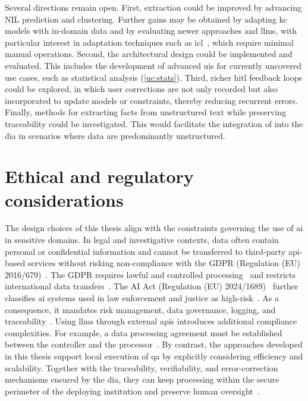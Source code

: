 \medskip
\noindent
Several directions remain open. First, extraction could be improved by advancing NIL prediction and clustering. Further gains may be obtained by adapting \acl{kc} models with in-domain data and by evaluating newer approaches and \acp{llm}, with particular interest in adaptation techniques such as \acl{icl}~\cite{jm3}, which require minimal manual operations.
Second, the architectural design could be implemented and evaluated. This includes the development of advanced \acp{ui} for currently uncovered use cases, such as statistical analysis (\ref{uc:stats}).
Third, richer \acl{hitl} feedback loops could be explored, in which user corrections are not only recorded but also incorporated to update models or constraints, thereby reducing recurrent errors.
Finally, methods for extracting facts from unstructured text while preserving traceability could be investigated. This would facilitate the integration of  into the \acl{dia} in scenarios where data are predominantly unstructured.

\section{Ethical and regulatory considerations}
The design choices of this thesis align with the constraints governing the use of \acf{ai} in sensitive domains. In legal and investigative contexts, data often contain personal or confidential information and cannot be transferred to third-party \ac{api}-based services without risking non-compliance with the GDPR (Regulation (EU) 2016/679)~\cite{gdpr2016}. The GDPR requires lawful and controlled processing~\cite[Art.~5]{gdpr2016} and restricts international data transfers~\cite[Art.~44--49]{gdpr2016}.
The AI Act (Regulation (EU) 2024/1689)~\cite{ai_act} further classifies \ac{ai} systems used in law enforcement and justice as high-risk~\cite[Annex~III]{ai_act}. As a consequence, it mandates risk management, data governance, logging, and traceability~\cite[Art.~9--12]{ai_act}.
Using \acp{llm} through external \acp{api} introduces additional compliance complexities. For example, a data processing agreement must be established between the controller and the processor~\cite[Art.~28(3)]{gdpr2016}.
By contrast, the approaches developed in this thesis support local execution of \acl{qa} by explicitly considering efficiency and scalability. Together with the traceability, verifiability, and error-correction mechanisms ensured by the \acl{dia}, they can keep processing within the secure perimeter of the deploying institution and preserve human oversight~\cite[Art.~14]{ai_act}.


